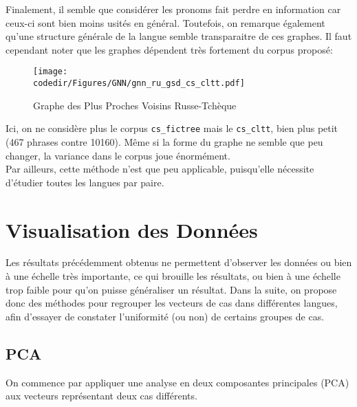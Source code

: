 \documentclass{cours}
\newcommand{\codedir}{Morphosyntactic-Categories_Code}
\begin{document}
    Finalement, il semble que considérer les pronoms fait perdre en information car ceux-ci sont bien moins usités en général. Toutefois, on remarque également qu'une structure générale de la langue semble transparaitre de ces graphes.
    Il faut cependant noter que les graphes dépendent très fortement du corpus proposé:
    \begin{figure}[H]
	    \centering
	    \texttt{[image: \\codedir/Figures/GNN/gnn\_ru\_gsd\_cs\_cltt.pdf]}
	    \caption{Graphe des Plus Proches Voisins Russe-Tchèque}
    \end{figure}
    Ici, on ne considère plus le corpus \texttt{cs\_fictree} mais le \texttt{cs\_cltt}, bien plus petit (467 phrases contre 10160).
    Même si la forme du graphe ne semble que peu changer, la variance dans le corpus joue énormément.\\
    Par ailleurs, cette méthode n'est que peu applicable, puisqu'elle nécessite d'étudier toutes les langues par paire.

\section{Visualisation des Données}
Les résultats précédemment obtenus ne permettent d'observer les données ou bien à une échelle très importante, ce qui brouille les résultats, ou bien à une échelle trop faible pour qu'on puisse généraliser un résultat.
Dans la suite, on propose donc des méthodes pour regrouper les vecteurs de cas dans différentes langues, afin d'essayer de constater l'uniformité (ou non) de certains groupes de cas.

\subsection{PCA}
On commence par appliquer une analyse en deux composantes principales (PCA) aux vecteurs représentant deux cas différents.
\end{document}
